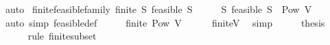 \begin{isabellebody}
\ auto\isanewline
{}\isamarkupfalse%
%
\endisatagproof
{\isafoldproof}%
%
\isadelimproof
\isanewline
%
\endisadelimproof
\isanewline
{}\isamarkupfalse%
\ finite{\isacharunderscore}{\kern0pt}feasible{\isacharunderscore}{\kern0pt}family{\isacharcolon}{\kern0pt}\ {\isachardoublequoteopen}finite\ {\isacharbraceleft}{\kern0pt}S{\isachardot}{\kern0pt}\ feasible\ S{\isacharbraceright}{\kern0pt}{\isachardoublequoteclose}\isanewline
%
\isadelimproof
%
\endisadelimproof
%
\isatagproof
{}\isamarkupfalse%
\ {\isacharminus}{\kern0pt}\isanewline
\ \ \isamarkupfalse%
\ {\isachardoublequoteopen}{\isacharbraceleft}{\kern0pt}S{\isachardot}{\kern0pt}\ feasible\ S{\isacharbraceright}{\kern0pt}\ {\isasymsubseteq}\ Pow\ V{\isachardoublequoteclose}\isanewline
\ \ \ \ \isamarkupfalse%
\ {\isacharparenleft}{\kern0pt}auto\ simp{\isacharcolon}{\kern0pt}\ feasible{\isacharunderscore}{\kern0pt}def{\isacharparenright}{\kern0pt}\isanewline
\ \ \isamarkupfalse%
\ \isamarkupfalse%
\ {\isachardoublequoteopen}finite\ {\isacharparenleft}{\kern0pt}Pow\ V{\isacharparenright}{\kern0pt}{\isachardoublequoteclose}\isanewline
\ \ \ \ \isamarkupfalse%
\ finite{\isacharunderscore}{\kern0pt}V\ \isamarkupfalse%
\ simp\isanewline
\ \ \isamarkupfalse%
\ \isamarkupfalse%
\ {\isacharquery}{\kern0pt}thesis\isanewline
\ \ \ \ \isamarkupfalse%
\ {\isacharparenleft}{\kern0pt}rule\ finite{\isacharunderscore}{\kern0pt}subset{\isacharparenright}{\kern0pt}\isanewline
{}\isamarkupfalse%
%
\endisatagproof
{\isafoldproof}%
%
\isadelimproof
\isanewline
%
\endisadelimproof
\isanewline
{}\isamarkupfalse%
\isanewline
%
\isadelimtheory
\isanewline
%
\endisadelimtheory
%
\isatagtheory
{}\isamarkupfalse%
%
\endisatagtheory
{\isafoldtheory}%
%
\isadelimtheory
%
\endisadelimtheory
%
\end{isabellebody}%
\endinput
